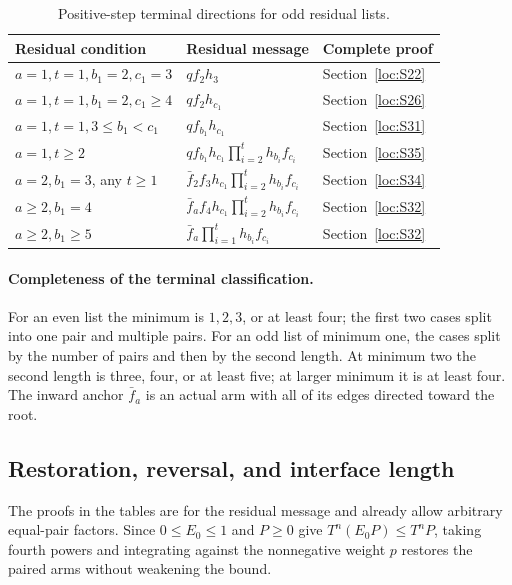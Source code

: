 \begin{table}[htbp]
\centering
\caption{Positive-step terminal directions for odd residual lists.}\label{tab:terminal-odd}
\fontsize{9}{11}\selectfont
\setlength{\tabcolsep}{1pt}\noindent\begin{tabular}{@{}p{54mm}p{71mm}p{29mm}@{}}
\toprule
Residual condition & Residual message & Complete proof\\\midrule
$a=1,t=1,b_1=2,c_1=3$ & $qf_2h_3$ & Section~\ref{loc:S22}\\
$a=1,t=1,b_1=2,c_1\ge4$ & $qf_2h_{c_1}$ & Section~\ref{loc:S26}\\
$a=1,t=1,3\le b_1<c_1$ & $qf_{b_1}h_{c_1}$ & Section~\ref{loc:S31}\\
$a=1,t\ge2$ & $qf_{b_1}h_{c_1}\prod_{i=2}^t h_{b_i}f_{c_i}$ & Section~\ref{loc:S35}\\
$a=2,b_1=3$, any $t\ge1$ & $\bar f_2f_3h_{c_1}\prod_{i=2}^t h_{b_i}f_{c_i}$ & Section~\ref{loc:S34}\\
$a\ge2,b_1=4$ & $\bar f_af_4h_{c_1}\prod_{i=2}^t h_{b_i}f_{c_i}$ & Section~\ref{loc:S32}\\
$a\ge2,b_1\ge5$ & $\bar f_a\prod_{i=1}^t h_{b_i}f_{c_i}$ & Section~\ref{loc:S32}\\
\bottomrule
\end{tabular}

\end{table}

\paragraph{Completeness of the terminal classification.}
For an even list the minimum is $1,2,3$, or at least four; the first
two cases split into one pair and multiple pairs.  For an odd list of
minimum one, the cases split by the number of pairs and then by the second
length.  At minimum two the second length is three, four, or at
least five; at larger minimum it is at least four.  The inward
anchor $\bar f_a$ is an actual arm with all of its edges directed toward
the root.

\subsection{Restoration, reversal, and interface length}
The proofs in the tables are for the residual message and already allow arbitrary equal-pair factors. Since $0\le E_0\le1$ and $P\ge0$ give $T^n(E_0P)\le T^nP$, taking fourth powers and integrating against the nonnegative weight $p$ restores the paired arms without weakening the bound.

